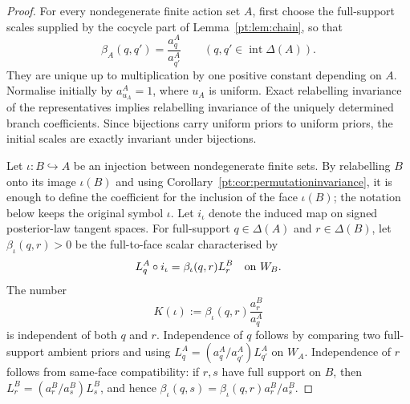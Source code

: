 \documentclass[11pt,a4paper]{article}
\theoremstyle{definition}
\newcommand{\1}{\mathbf 1}
\begin{document}
\begin{proof}
For every nondegenerate finite action set $A$, first choose the full-support scales supplied by the cocycle part of
Lemma~\ref{pt:lem:chain}, so that
\[
\beta_A(q,q')=\frac{a^A_q}{a^A_{q'}}
\qquad(q,q'\in\operatorname{int}\Delta(A)).
\]
They are unique up to multiplication by one positive constant depending on $A$.  Normalise initially by
$a^A_{u_A}=1$, where $u_A$ is uniform.  Exact relabelling invariance of the representatives implies relabelling
invariance of the uniquely determined branch coefficients.  Since bijections carry uniform priors to uniform priors,
the initial scales are exactly invariant under bijections.

Let $\iota:B\hookrightarrow A$ be an injection between nondegenerate finite sets.  By relabelling $B$ onto its image
$\iota(B)$ and using Corollary~\ref{pt:cor:permutationinvariance}, it is enough to define the coefficient for the inclusion
of the face $\iota(B)$; the notation below keeps the original symbol $\iota$.  Let $i_\iota$ denote the induced map on
signed posterior-law tangent spaces.  For full-support $q\in\Delta(A)$ and $r\in\Delta(B)$, let
$\beta_\iota(q,r)>0$ be the full-to-face scalar characterised by
\[
L_q^A\circ i_\iota=\beta_\iota(q,r)L_r^B
\quad\hbox{on }W_B.
\]
The number
\begin{equation}
K(\iota):=\beta_\iota(q,r)\frac{a^B_r}{a^A_q}
\tag{K}\label{pt:eq:embeddingdefect}
\end{equation}
is independent of both $q$ and $r$.  Independence of $q$ follows by comparing two full-support ambient priors and using
$L_q^A=(a_q^A/a_{q'}^A)L_{q'}^A$ on $W_A$.  Independence of $r$ follows from same-face compatibility: if $r,s$ have
full support on $B$, then $L_r^B=(a_r^B/a_s^B)L_s^B$, and hence
$\beta_\iota(q,s)=\beta_\iota(q,r)a_r^B/a_s^B$.


\end{proof}
\end{document}
